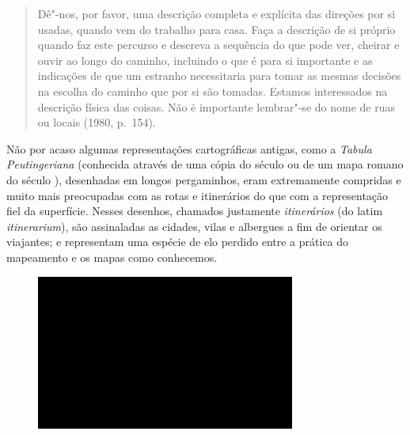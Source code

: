 \begin{quote} %
Dê"-nos, por favor, uma descrição completa e explícita das direções por
si usadas, quando vem do trabalho para casa. Faça a descrição de si
próprio quando faz este percurso e descreva a sequência do que pode ver,
cheirar e ouvir ao longo do caminho, incluindo o que é para si
importante e as indicações de que um estranho necessitaria para tomar as
mesmas decisões na escolha do caminho que por si são tomadas. Estamos
interessados na descrição física das coisas. Não é importante lembrar"-se
do nome de ruas ou locais (1980, p.~154).
\end{quote}

Não por acaso algumas representações cartográficas antigas, como a
\emph{Tabula Peutingeriana} (conhecida através de uma cópia do século
 ou  de um mapa romano do século ), desenhadas em longos
pergaminhos, eram extremamente compridas e muito mais preocupadas com as
rotas e itinerários do que com a representação fiel da superfície.
Nesses desenhos, chamados justamente \emph{itinerários} (do
latim \emph{itinerarium}), são assinaladas as cidades, vilas e albergues
a fim de orientar os viajantes; e representam uma espécie de elo perdido
entre a prática do mapeamento e os mapas como conhecemos.

\begin{figure}[!ht]
\centering
 \includegraphics[width=85mm]{./imgs/im1.jpg}
\caption{\tiny{}}
\end{figure}

